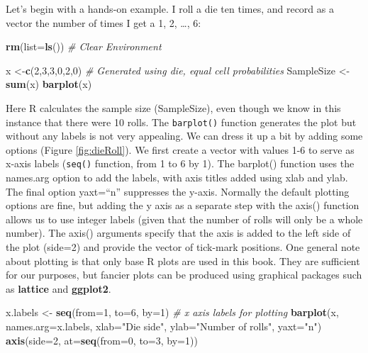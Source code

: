 \documentclass[
]{krantz}
\makeatletter
\newenvironment{Shaded}{\begin{snugshade}}{\end{snugshade}}
\newcommand{\AttributeTok}[1]{\textcolor[rgb]{0.27,0.27,0.27}{#1}}
\newcommand{\CommentTok}[1]{\textcolor[rgb]{0.37,0.37,0.37}{\textit{#1}}}
\newcommand{\DecValTok}[1]{\textcolor[rgb]{0.06,0.06,0.06}{#1}}
\newcommand{\FunctionTok}[1]{\textcolor[rgb]{0.27,0.27,0.27}{\textbf{#1}}}
\newcommand{\NormalTok}[1]{#1}
\newcommand{\OtherTok}[1]{\textcolor[rgb]{0.37,0.37,0.37}{#1}}
\newcommand{\StringTok}[1]{\textcolor[rgb]{0.5,0.5,0.5}{#1}}
\newenvironment{kframe}{%
\medskip{}
\setlength{\fboxsep}{.8em}
 \def\at@end@of@kframe{}%
 \ifinner\ifhmode%
  \def\at@end@of@kframe{\end{minipage}}%
  \begin{minipage}{\columnwidth}%
 \fi\fi%
 \def\FrameCommand##1{\hskip\@totalleftmargin \hskip-\fboxsep
 \colorbox{shadecolor}{##1}\hskip-\fboxsep
     \hskip-\linewidth \hskip-\@totalleftmargin \hskip\columnwidth}%
 \MakeFramed {\advance\hsize-\width
   \@totalleftmargin\z@ \linewidth\hsize
   \@setminipage}}%
 {\par\unskip\endMakeFramed%
 \at@end@of@kframe}
\renewenvironment{Shaded}{\begin{kframe}}{\end{kframe}}
\makeatother
\begin{document}
Let's begin with a hands-on example. I roll a die ten times, and record as a vector the number of times I get a 1, 2, \ldots, 6:

\begin{Shaded}
\begin{Highlighting}[]
\FunctionTok{rm}\NormalTok{(}\AttributeTok{list=}\FunctionTok{ls}\NormalTok{()) }\CommentTok{\# Clear Environment}

\NormalTok{x }\OtherTok{\textless{}{-}}\FunctionTok{c}\NormalTok{(}\DecValTok{2}\NormalTok{,}\DecValTok{3}\NormalTok{,}\DecValTok{3}\NormalTok{,}\DecValTok{0}\NormalTok{,}\DecValTok{2}\NormalTok{,}\DecValTok{0}\NormalTok{)  }\CommentTok{\# Generated using die, equal cell probabilities}
\NormalTok{SampleSize }\OtherTok{\textless{}{-}} \FunctionTok{sum}\NormalTok{(x)}
\FunctionTok{barplot}\NormalTok{(x)}
\end{Highlighting}
\end{Shaded}

Here R calculates the sample size (SampleSize), even though we know in this instance that there were 10 rolls. The \texttt{barplot()} function generates the plot but without any labels is not very appealing. We can dress it up a bit by adding some options (Figure \ref{fig:dieRoll}). We first create a vector with values 1-6 to serve as x-axis labels (\texttt{seq()} function, from 1 to 6 by 1). The barplot() function uses the names.arg option to add the labels, with axis titles added using xlab and ylab. The final option yaxt=``n'' suppresses the y-axis. Normally the default plotting options are fine, but adding the y axis as a separate step with the axis() function allows us to use integer labels (given that the number of rolls will only be a whole number). The axis() arguments specify that the axis is added to the left side of the plot (side=2) and provide the vector of tick-mark positions. One general note about plotting is that only base R plots are used in this book. They are sufficient for our purposes, but fancier plots can be produced using graphical packages such as \textbf{lattice} and \textbf{ggplot2}.

\begin{Shaded}
\begin{Highlighting}[]
\NormalTok{x.labels }\OtherTok{\textless{}{-}} \FunctionTok{seq}\NormalTok{(}\AttributeTok{from=}\DecValTok{1}\NormalTok{, }\AttributeTok{to=}\DecValTok{6}\NormalTok{, }\AttributeTok{by=}\DecValTok{1}\NormalTok{) }\CommentTok{\# x axis labels for plotting}
\FunctionTok{barplot}\NormalTok{(x, }\AttributeTok{names.arg=}\NormalTok{x.labels, }\AttributeTok{xlab=}\StringTok{"Die side"}\NormalTok{, }\AttributeTok{ylab=}\StringTok{"Number of rolls"}\NormalTok{,}
        \AttributeTok{yaxt=}\StringTok{"n"}\NormalTok{)}
\FunctionTok{axis}\NormalTok{(}\AttributeTok{side=}\DecValTok{2}\NormalTok{, }\AttributeTok{at=}\FunctionTok{seq}\NormalTok{(}\AttributeTok{from=}\DecValTok{0}\NormalTok{, }\AttributeTok{to=}\DecValTok{3}\NormalTok{, }\AttributeTok{by=}\DecValTok{1}\NormalTok{))}
\end{Highlighting}
\end{Shaded}
\end{document}
